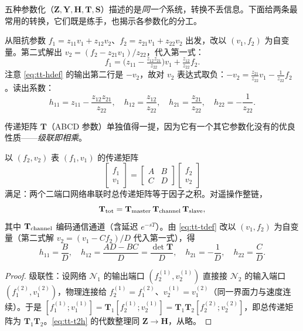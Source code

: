 五种参数化（$\mathbf Z,\mathbf Y,\mathbf H,\mathbf T,\mathbf S$）描述的是\emph{同一个}系统，转换不丢信息。下面给两条最常用的转换，它们既是练手，也揭示各参数化的分工。

\begin{derivation}
从阻抗参数 $f_1=z_{11}v_1+z_{12}v_2$、$f_2=z_{21}v_1+z_{22}v_2$ 出发，改以 $(v_1,f_2)$ 为自变量。第二式解出 $v_2=(f_2-z_{21}v_1)/z_{22}$，代入第一式：
\begin{equation}
  f_1=\Big(z_{11}-\tfrac{z_{12}z_{21}}{z_{22}}\Big)v_1+\tfrac{z_{12}}{z_{22}}f_2 .
\end{equation}
注意 \cref{eq:tt-hdef} 的输出第二行是 $-v_2$，故对 $v_2$ 表达式取负：$-v_2=\tfrac{z_{21}}{z_{22}}v_1-\tfrac{1}{z_{22}}f_2$。读出系数：
\begin{equation}
  h_{11}=z_{11}-\frac{z_{12}z_{21}}{z_{22}},\quad
  h_{12}=\frac{z_{12}}{z_{22}},\quad
  h_{21}=\frac{z_{21}}{z_{22}},\quad
  h_{22}=-\frac{1}{z_{22}}.
  \label{eq:tt-z2h}
\end{equation}
\end{derivation}

传递矩阵 $\mathbf T$（ABCD 参数）单独值得一提，因为它有一个其它参数化没有的优良性质——\emph{级联即相乘}。

\begin{proposition}\label{prop:tt-cascade}
以 $(f_2,v_2)$ 表 $(f_1,v_1)$ 的传递矩阵
\begin{equation}
  \begin{bmatrix}f_1\\v_1\end{bmatrix}
  =\begin{bmatrix}A&B\\C&D\end{bmatrix}\begin{bmatrix}f_2\\v_2\end{bmatrix}
  \label{eq:tt-tdef}
\end{equation}
满足：两个二端口网络串联时总传递矩阵等于因子之积。对遥操作整链，
\begin{equation}
  \mathbf T_{\rm tot}=\mathbf T_{\rm master}\,\mathbf T_{\rm channel}\,\mathbf T_{\rm slave},
  \label{eq:tt-Ttot}
\end{equation}
其中 $\mathbf T_{\rm channel}$ 编码通信通道（含延迟 $e^{-sT}$）。由 \cref{eq:tt-tdef} 改以 $(v_1,f_2)$ 为自变量（第二式解 $v_2=(v_1-Cf_2)/D$ 代入第一式），得
\begin{equation}
  h_{11}=\frac{B}{D},\quad
  h_{12}=\frac{AD-BC}{D}=\frac{\det\mathbf T}{D},\quad
  h_{21}=-\frac{1}{D},\quad
  h_{22}=\frac{C}{D}.
  \label{eq:tt-t2h}
\end{equation}
\end{proposition}
\begin{proof}
级联性：设网络 $\mathcal N_1$ 的输出端口 $(f_2^{(1)},v_2^{(1)})$ 直接接 $\mathcal N_2$ 的输入端口 $(f_1^{(2)},v_1^{(2)})$，物理连接给 $f_2^{(1)}=f_1^{(2)}$、$v_2^{(1)}=v_1^{(2)}$（同一界面力与速度连续）。于是 $[f_1^{(1)};v_1^{(1)}]=\mathbf T_1[f_2^{(1)};v_2^{(1)}]=\mathbf T_1\mathbf T_2[f_2^{(2)};v_2^{(2)}]$，即总传递矩阵为 $\mathbf T_1\mathbf T_2$。\cref{eq:tt-t2h} 的代数整理同 $\mathbf Z\to\mathbf H$，从略。
\end{proof}

